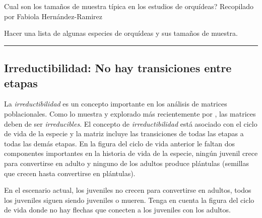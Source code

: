 \documentclass[
]{book}
\theoremstyle{definition}
\theoremstyle{definition}
\theoremstyle{definition}
\theoremstyle{definition}
\theoremstyle{remark}
\begin{document}
Cual son los tamaños de muestra típica en los estudios de orquídeas?
Recopilado por Fabiola Hernández-Ramirez

Hacer una lista de algunas especies de orquídeas y sus tamaños de muestra.

\begin{center}\rule{0.5\linewidth}{0.5pt}\end{center}

\subsection{Irreductibilidad: No hay transiciones entre etapas}\label{irreductibilidad-no-hay-transiciones-entre-etapas}

La \emph{irreductibilidad} es un concepto importante en los análisis de matrices poblacionales. Como lo muestra \citet{caswell2000matrix} y explorado más recientemente por \citet{stott2010}, las matrices deben de ser \emph{irreducibles}. El concepto de \emph{irreductibilidad} está asociado con el ciclo de vida de la especie y la matriz incluye las transiciones de todas las etapas a todas las demás etapas. En la figura del ciclo de vida anterior le faltan dos componentes importantes en la historia de vida de la especie, ningún juvenil crece para convertirse en adulto y ninguno de los adultos produce plántulas (semillas que crecen hasta convertirse en plántulas).

En el escenario actual, los juveniles no crecen para convertirse en adultos, todos los juveniles siguen siendo juveniles o mueren. Tenga en cuenta la figura del ciclo de vida donde no hay flechas que conecten a los juveniles con los adultos.
\end{document}
